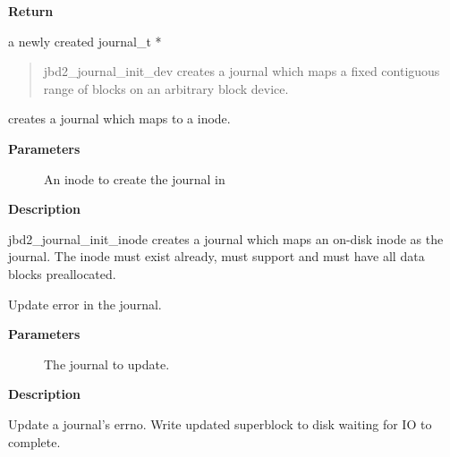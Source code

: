 \documentclass[a4paper,8pt,english]{sphinxmanual}
\begin{document}
\textbf{Return}

a newly created journal\_t *
\begin{quote}

jbd2\_journal\_init\_dev creates a journal which maps a fixed contiguous
range of blocks on an arbitrary block device.
\end{quote}

\begin{fulllineitems}
\label{filesystems/index:c.jbd2_journal_init_inode}
creates a journal which maps to a inode.

\end{fulllineitems}


\textbf{Parameters}
\begin{description}
\item[{}] \leavevmode
An inode to create the journal in

\end{description}

\textbf{Description}

jbd2\_journal\_init\_inode creates a journal which maps an on-disk inode as
the journal.  The inode must exist already, must support {\hyperref[filesystems/index:c.bmap]{\emph{}}} and
must have all data blocks preallocated.

\begin{fulllineitems}
\label{filesystems/index:c.jbd2_journal_update_sb_errno}
Update error in the journal.

\end{fulllineitems}


\textbf{Parameters}
\begin{description}
\item[{}] \leavevmode
The journal to update.

\end{description}

\textbf{Description}

Update a journal's errno.  Write updated superblock to disk waiting for IO
to complete.
\end{document}
